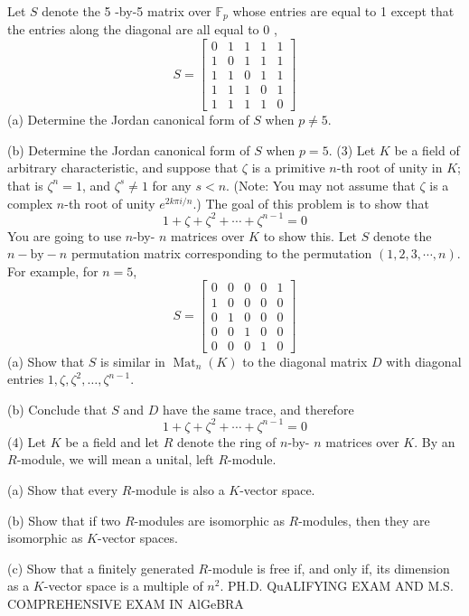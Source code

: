 \documentclass[10pt]{article}
\begin{document}
Let $S$ denote the 5 -by-5 matrix over $\mathbb{F}_{p}$ whose entries are equal to 1 except that the entries along the diagonal are all equal to 0 ,
$$
S=\left[\begin{array}{lllll}
0 & 1 & 1 & 1 & 1 \\
1 & 0 & 1 & 1 & 1 \\
1 & 1 & 0 & 1 & 1 \\
1 & 1 & 1 & 0 & 1 \\
1 & 1 & 1 & 1 & 0
\end{array}\right]
$$
(a) Determine the Jordan canonical form of $S$ when $p \neq 5$.

(b) Determine the Jordan canonical form of $S$ when $p=5$. (3) Let $K$ be a field of arbitrary characteristic, and suppose that $\zeta$ is a primitive $n$-th root of unity in $K$; that is $\zeta^{n}=1$, and $\zeta^{s} \neq 1$ for any $s<n$. (Note: You may not assume that $\zeta$ is a complex $n$-th root of unity $e^{2 k \pi i / n}$.) The goal of this problem is to show that
$$
1+\zeta+\zeta^{2}+\cdots+\zeta^{n-1}=0
$$
You are going to use $n$-by- $n$ matrices over $K$ to show this. Let $S$ denote the $n-\mathrm{by}-n$ permutation matrix corresponding to the permutation $(1,2,3, \cdots, n)$. For example, for $n=5$,
$$
S=\left[\begin{array}{lllll}
0 & 0 & 0 & 0 & 1 \\
1 & 0 & 0 & 0 & 0 \\
0 & 1 & 0 & 0 & 0 \\
0 & 0 & 1 & 0 & 0 \\
0 & 0 & 0 & 1 & 0
\end{array}\right]
$$
(a) Show that $S$ is similar in $\operatorname{Mat}_{n}(K)$ to the diagonal matrix $D$ with diagonal entries $1, \zeta, \zeta^{2}, \ldots, \zeta^{n-1}$.

(b) Conclude that $S$ and $D$ have the same trace, and therefore
$$
1+\zeta+\zeta^{2}+\cdots+\zeta^{n-1}=0
$$
(4) Let $K$ be a field and let $R$ denote the ring of $n$-by- $n$ matrices over $K$. By an $R$-module, we will mean a unital, left $R$-module.

(a) Show that every $R$-module is also a $K$-vector space.

(b) Show that if two $R$-modules are isomorphic as $R$-modules, then they are isomorphic as $K$-vector spaces.

(c) Show that a finitely generated $R$-module is free if, and only if, its dimension as a $K$-vector space is a multiple of $n^{2}$. PH.D. QuALIFYING EXAM AND M.S. COMPREHENSIVE EXAM IN AlGeBRA
\end{document}
